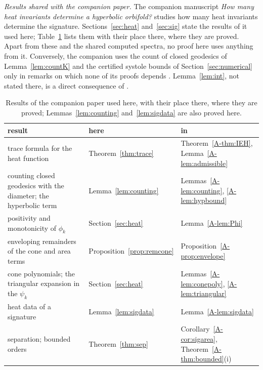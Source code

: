 \documentclass[pdflatex,sn-mathphys-num]{sn-jnl}
\theoremstyle{thmstyleone}%
\theoremstyle{thmstylethree}%
\begin{document}
\emph{Results shared with the companion paper.} The companion manuscript \emph{How many heat invariants determine a hyperbolic orbifold?} \cite{companionA} studies how many heat invariants determine the signature. Sections~\ref{sec:heat} and~\ref{sec:sig} state the results of it used here; Table~\ref{tab:shared} lists them with their place there, where they are proved. Apart from these and the shared computed spectra, no proof here uses anything from it. Conversely, the companion uses the count of closed geodesics of Lemma~\ref{lem:countK} and the certified systole bounds of Section~\ref{sec:numerical} only in remarks on which none of its proofs depends \cite[Remark~\ref*{A-rem:nodiam}]{companionA}. Lemma~\ref{lem:int}, not stated there, is a direct consequence of \cite[Lemmas~\ref*{A-lem:triangular} and~\ref*{A-lem:sigdata}]{companionA}.

\begin{table}[h]
\centering\footnotesize
\caption{Results of the companion paper \cite{companionA} used here, with their place there, where they are proved; Lemmas~\ref{lem:counting} and~\ref{lem:sigdata} are also proved here.}\label{tab:shared}
\setlength{\tabcolsep}{3pt}\begin{tabular}{@{}p{50mm}p{27mm}p{40mm}@{}}
\toprule
result & here & in \cite{companionA}\\
\midrule
trace formula for the heat function & Theorem~\ref{thm:trace} & Theorem~\ref*{A-thm:IEH}, Lemma~\ref*{A-lem:admissible}\\
counting closed geodesics with the diameter; the hyperbolic term & Lemma~\ref{lem:counting} & Lemmas~\ref*{A-lem:counting}, \ref*{A-lem:hypbound}\\
positivity and monotonicity of $\phi_k$ & Section~\ref{sec:heat} & Lemma~\ref*{A-lem:Phi}\\
enveloping remainders of the cone and area terms & Proposition~\ref{prop:remcone} & Proposition~\ref*{A-prop:envelope}\\
cone polynomials; the triangular expansion in the $\psi_k$ & Section~\ref{sec:heat} & Lemmas~\ref*{A-lem:conepoly}, \ref*{A-lem:triangular}\\
heat data of a signature & Lemma~\ref{lem:sigdata} & Lemma~\ref*{A-lem:sigdata}\\
separation; bounded orders & Theorem~\ref{thm:sep} & Corollary~\ref*{A-cor:sigarea}, Theorem~\ref*{A-thm:bounded}(i)\\
\bottomrule
\end{tabular}
\end{table}
\end{document}
